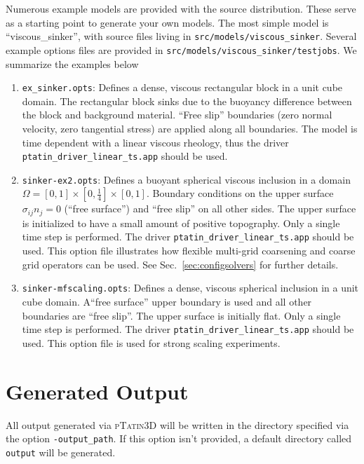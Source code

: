\documentclass[paper=a4, fontsize=10pt,twoside]{scrartcl}
\newcommand{\ptat}{{{\textsc{pTatin3D}}}}
\newcommand{\unix}[1]{\texttt{\footnotesize #1}}
\begin{document}
Numerous example models are provided with the source distribution. These serve as a starting point to generate your own models. The most simple model is ``viscous\_sinker'', with source files living in \unix{src/models/viscous\_sinker}. Several example options files are provided in \unix{src/models/viscous\_sinker/testjobs}. We summarize the examples below
\begin{enumerate}
  \item \texttt{ex\_sinker.opts}: Defines a dense, viscous rectangular block in a unit cube domain. The rectangular block sinks due to the buoyancy difference between the block and background material. ``Free slip'' boundaries (zero normal velocity, zero tangential stress) are applied along all boundaries. The model is time dependent with a linear viscous rheology, thus the driver \unix{ptatin\_driver\_linear\_ts.app} should be used.

  \item \texttt{sinker-ex2.opts}: Defines a buoyant spherical viscous inclusion in a domain $\Omega = [0,1] \times [0,\tfrac{1}{4}] \times [0,1]$. Boundary conditions on the upper surface $\sigma_{ij}n_j=0$ (``free surface'') and ``free slip'' on all other sides. The upper surface is initialized to have a small amount of positive topography. Only a single time step is performed. The driver \unix{ptatin\_driver\_linear\_ts.app} should be used. This option file illustrates how flexible multi-grid coarsening and coarse grid operators can be used. See Sec.~\ref{sec:configsolvers} for further details.

  \item \texttt{sinker-mfscaling.opts}: Defines a dense, viscous spherical inclusion in a unit cube domain. A``free surface'' upper boundary is used and all other boundaries are ``free slip''. The upper surface is initially flat. Only a single time step is performed. The driver \unix{ptatin\_driver\_linear\_ts.app} should be used. This option file is used for strong scaling experiments.
\end{enumerate}

\section{Generated Output}
All output generated via {\ptat} will be written in the directory specified via the option \unix{-output\_path}. If this option isn't provided, a default directory called \texttt{output} will be generated.
\end{document}
